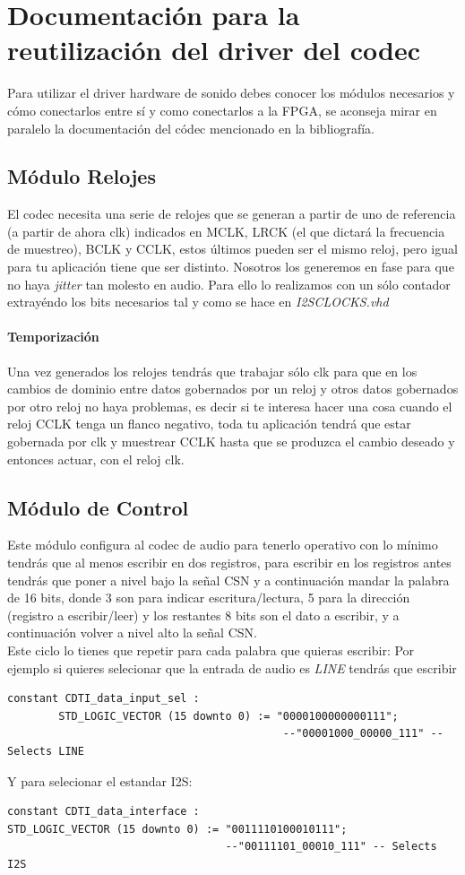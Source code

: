 \appendix


\section{Documentación para la reutilización del driver del codec}
	Para utilizar el driver hardware de sonido debes conocer los módulos necesarios y cómo conectarlos entre sí y como conectarlos a la FPGA, se aconseja mirar en paralelo la documentación del códec mencionado en la bibliografía.
	\subsection{Módulo Relojes}
		El codec necesita una serie de relojes que se generan a partir de uno de referencia (a partir de ahora clk) indicados en \cite{AK4565} MCLK, LRCK (el que dictará la frecuencia de muestreo), BCLK y CCLK, estos últimos pueden ser el mismo reloj, pero igual para tu aplicación tiene que ser distinto.
		Nosotros los generemos en fase para que no haya \emph{jitter} tan molesto en audio. Para ello lo realizamos con un sólo contador extrayéndo los bits necesarios tal y como se hace en \emph{I2SCLOCKS.vhd} \\
		
	\paragraph{Temporización}
Una vez generados los relojes tendrás que trabajar sólo clk para que en los cambios de dominio entre datos gobernados por un reloj y otros datos gobernados por otro reloj no haya problemas, es decir si te interesa hacer una cosa cuando el reloj CCLK tenga un flanco negativo, toda tu aplicación tendrá que estar gobernada por clk y muestrear CCLK hasta que se produzca el cambio deseado y entonces actuar, con el reloj clk.
	
	\subsection{Módulo de Control}
		Este módulo configura al codec de audio para tenerlo operativo con lo mínimo tendrás que al menos escribir en dos registros, para escribir en los registros antes tendrás que poner a nivel bajo la señal CSN y a continuación mandar la palabra de 16 bits, donde 3 son para indicar escritura/lectura, 5 para la dirección (registro a escribir/leer) y los restantes 8 bits son el dato a escribir, y a continuación volver a nivel alto la señal CSN. \\
		Este ciclo lo tienes que repetir para cada palabra que quieras escribir:
		Por ejemplo si quieres selecionar que la entrada de audio es \emph{LINE} tendrás que escribir
		\begin{verbatim}
constant CDTI_data_input_sel : 
		STD_LOGIC_VECTOR (15 downto 0) := "0000100000000111";	
						  			       --"00001000_00000_111" -- Selects LINE
\end{verbatim}
	Y para selecionar el estandar I2S:
	\begin{verbatim}
constant CDTI_data_interface : 
STD_LOGIC_VECTOR (15 downto 0) := "0011110100010111"; 
						          --"00111101_00010_111" -- Selects I2S
\end{verbatim}
	
